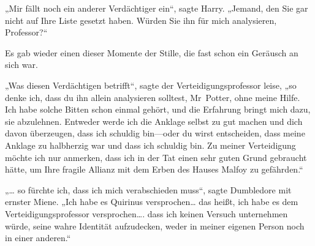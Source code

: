 „Mir fällt noch ein anderer Verdächtiger ein“, sagte Harry. „Jemand, den Sie gar nicht auf Ihre Liste gesetzt haben. Würden Sie ihn für mich analysieren, Professor?“

Es gab wieder einen dieser Momente der Stille, die fast schon ein Geräusch an sich war.

„Was diesen Verdächtigen betrifft“, sagte der Verteidigungsprofessor leise, „so denke ich, dass du ihn allein analysieren solltest, Mr~Potter, ohne meine Hilfe. Ich habe solche Bitten schon einmal gehört, und die Erfahrung bringt mich dazu, sie abzulehnen. Entweder werde ich die Anklage selbst zu gut machen und dich davon überzeugen, dass ich schuldig bin—oder du wirst entscheiden, dass meine Anklage zu halbherzig war und dass ich schuldig bin. Zu meiner Verteidigung möchte ich nur anmerken, dass ich in der Tat einen sehr guten Grund gebraucht hätte, um Ihre fragile Allianz mit dem Erben des Hauses Malfoy zu gefährden.“


„… so fürchte ich, dass ich mich verabschieden muss“, sagte Dumbledore mit ernster Miene. „Ich habe es Quirinus versprochen… das heißt, ich habe es dem Verteidigungsprofessor versprochen…. dass ich keinen Versuch unternehmen würde, seine wahre Identität aufzudecken, weder in meiner eigenen Person noch in einer anderen.“

